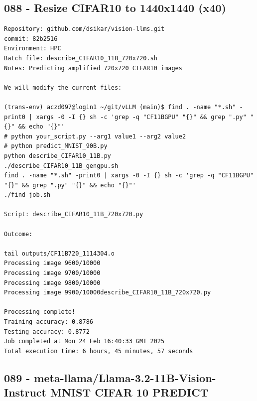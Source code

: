 \subsection{088 - Resize CIFAR10 to 1440x1440 (x40)}
\label{app_res:088}
\begin{verbatim}
Repository: github.com/dsikar/vision-llms.git
commit: 82b2516
Environment: HPC 
Batch file: describe_CIFAR10_11B_720x720.sh
Notes: Predicting amplified 720x720 CIFAR10 images

We will modify the current files:

(trans-env) aczd097@login1 ~/git/vLLM (main)$ find . -name "*.sh" -print0 | xargs -0 -I {} sh -c 'grep -q "CF11BGPU" "{}" && grep ".py" "{}" && echo "{}"'
# python your_script.py --arg1 value1 --arg2 value2
# python predict_MNIST_90B.py
python describe_CIFAR10_11B.py
./describe_CIFAR10_11B_gengpu.sh
find . -name "*.sh" -print0 | xargs -0 -I {} sh -c 'grep -q "CF11BGPU" "{}" && grep ".py" "{}" && echo "{}"'
./find_job.sh

Script: describe_CIFAR10_11B_720x720.py

Outcome:

tail outputs/CF11B720_1114304.o
Processing image 9600/10000
Processing image 9700/10000
Processing image 9800/10000
Processing image 9900/10000describe_CIFAR10_11B_720x720.py

Processing complete!
Training accuracy: 0.8786
Testing accuracy: 0.8772
Job completed at Mon 24 Feb 16:40:33 GMT 2025
Total execution time: 6 hours, 45 minutes, 57 seconds

\end{verbatim}

\subsection{089 - meta-llama/Llama-3.2-11B-Vision-Instruct MNIST CIFAR 10 PREDICT}
\label{app_res:089}

